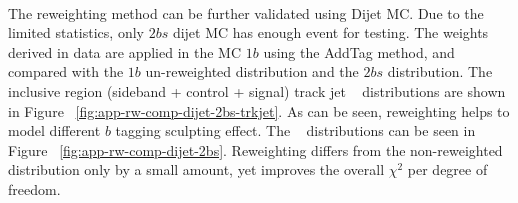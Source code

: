 \paragraph{}
The reweighting method can be further validated using Dijet MC. 
Due to the limited statistics, only $2bs$ dijet MC has enough event for testing. The weights derived in data are applied in the MC $1b$ using the AddTag method, and compared with the $1b$ un-reweighted distribution and the $2bs$ distribution. 
The inclusive region (sideband + control + signal) track jet \pt~ distributions are shown in Figure ~\ref{fig:app-rw-comp-dijet-2bs-trkjet}. As can be seen, reweighting helps to model different $b$ tagging sculpting effect. 
The \mtwoJ~ distributions can be seen in Figure ~\ref{fig:app-rw-comp-dijet-2bs}. 
Reweighting differs from the non-reweighted distribution only by a small amount, yet improves the overall $\chi^2$ per degree of freedom.

